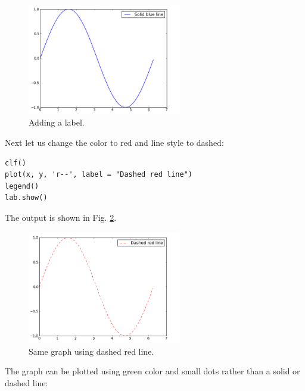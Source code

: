\begin{figure}[!ht]
\begin{center}
\includegraphics[width=0.6\textwidth]{imgp/plot2.png}
\end{center}
\vspace{-6mm}
\caption{Adding a label.}
\label{fig:plot2}
\end{figure}
\newpage
\noindent
Next let us change the color to red and line style to dashed: 

\begin{verbatim}
clf()
plot(x, y, 'r--', label = "Dashed red line")
legend()
lab.show()
\end{verbatim}
The output is shown in Fig. \ref{fig:plot3}.\\[-7mm]


\begin{figure}[!ht]
\begin{center}
\includegraphics[width=0.6\textwidth]{imgp/plot3.png}
\end{center}
\vspace{-6mm}
\caption{Same graph using dashed red line.}
\vspace{-1cm}
\label{fig:plot3}
\end{figure}
\newpage
\noindent
The graph can be plotted using green color and small dots rather than 
a solid or dashed line:

